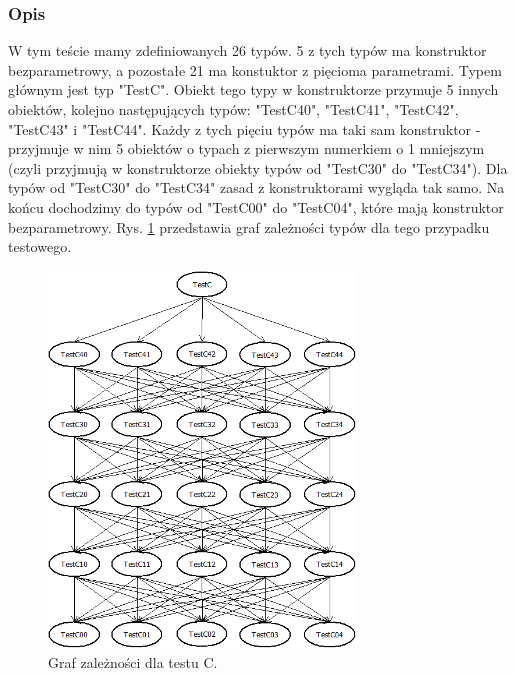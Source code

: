 \documentclass[12pt]{article}
\begin{document}
\subsubsection{Opis}
W tym teście mamy zdefiniowanych 26 typów. 5 z tych typów ma konstruktor bezparametrowy, a pozostałe 21 ma konstuktor z pięcioma parametrami. Typem głównym jest typ "TestC". Obiekt tego typy w konstruktorze przymuje 5 innych obiektów, kolejno następujących typów: "TestC40", "TestC41", "TestC42", "TestC43" i "TestC44". Każdy z tych pięciu typów ma taki sam konstruktor - przyjmuje w nim 5 obiektów o typach z pierwszym numerkiem o 1 mniejszym (czyli przyjmują w konstruktorze obiekty typów od "TestC30" do "TestC34"). Dla typów od "TestC30" do "TestC34" zasad z konstruktorami wygląda tak samo. Na końcu dochodzimy do typów od "TestC00" do "TestC04", które mają konstruktor bezparametrowy. Rys. \ref{fig:testC} przedstawia graf zależności typów dla tego przypadku testowego.

\begin{figure}[h]
	\begin{center}
  		\includegraphics[height=10cm]{TestC.png}
  		\caption{Graf zależności dla testu C.}
  		\label{fig:testC}
	\end{center}
\end{figure}
\end{document}

